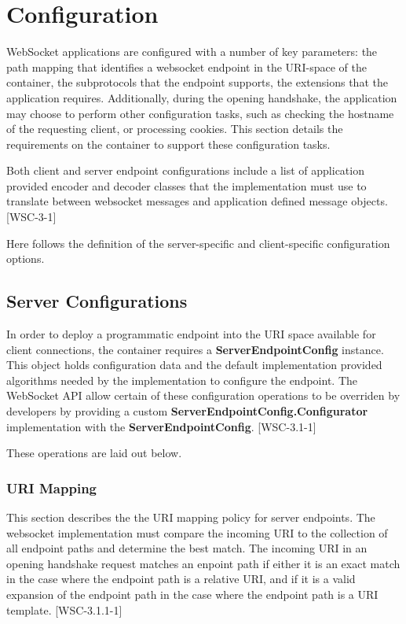 \chapter{Configuration}
\label{configuration}

WebSocket applications are configured with a number of key parameters: the path mapping that identifies a websocket endpoint in the URI-space of the container, the subprotocols that the endpoint supports, the extensions that the application requires. Additionally, during the opening handshake, the application may choose to perform other configuration tasks, such as checking the hostname of the requesting client, or processing cookies. This section details the requirements on the container to support these configuration tasks.

Both client and server endpoint configurations include a list of application provided encoder and decoder classes that the implementation must use to translate between websocket messages and application defined message objects. [WSC-3-1]

Here follows the definition of the server-specific and client-specific configuration options.

\section{Server Configurations}
\label{serverconfig}

In order to deploy a programmatic endpoint into the URI space available for client connections, the container requires a \textbf{ServerEndpointConfig} instance. This object holds configuration data and the default implementation provided algorithms needed by the implementation to configure the endpoint. The WebSocket API allow certain of these configuration operations to be overriden by developers by providing a custom \textbf{ServerEndpointConfig.Configurator} implementation with the \textbf{ServerEndpointConfig}. [WSC-3.1-1] 

These operations are laid out below.

\subsection{URI Mapping}

This section describes the the URI mapping policy for server endpoints. The websocket implementation must compare the incoming URI to the collection of all endpoint paths and determine the best match. The incoming URI in an opening handshake request matches an enpoint path if either it is an exact match in the case where the endpoint path is a relative URI, and if it is a valid expansion of the endpoint path in the case where the endpoint path is a URI template. [WSC-3.1.1-1]


